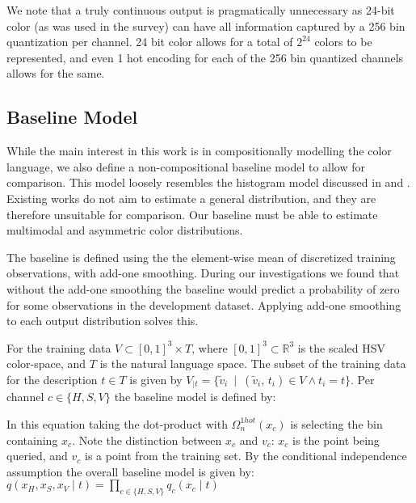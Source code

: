\documentclass[11pt,a4paper]{article}
\newcommand{\compactmath}[1]{\noindent\resizebox{\columnwidth}{!}{$#1$}}
\newcommand{\textcite}{\citet}
\begin{document}
We note that a truly continuous output is pragmatically unnecessary as 24-bit color (as was used in the survey) can have all information captured by a 256 bin quantization per channel.
24 bit color allows for a total of $2^{24}$ colors to be represented, and even 1 hot encoding for each of the 256 bin quantized channels allows for the same.


\subsection{Baseline Model}\label{sec:baseline-model}
While the main interest in this work is in compositionally modelling the color language,
we also define a non-compositional baseline model to allow for comparison.
This model loosely resembles the histogram model discussed in \textcite{meomcmahanstone:color} and \textcite{mcmahan2015bayesian}.
Existing works do not aim to estimate a general distribution, and they are therefore unsuitable for comparison.
Our baseline must be able to estimate multimodal and asymmetric color distributions.

The baseline is defined using the the element-wise mean of discretized  training observations, with add-one smoothing.
During our investigations we found that without the add-one smoothing the baseline would predict a probability of zero for some observations in the development dataset.
Applying add-one smoothing to each output distribution solves this.

For the training data $V \subset \left[ 0,1 \right] ^{3}\times T$, where $\left[ 0,1 \right] ^{3} \subset \mathbb{R}^{3}$ is the scaled HSV color-space, and $T$ is the natural language space.
The subset of the training data for the description $t \in T$ is given by
$V_{|t}=\{\tilde{v}_i \: \mid \: (\tilde{v}_i,\,t_i) \in V \wedge t_{i}=t\}$.
Per channel $c\in \lbrace H,S,V\rbrace$ the baseline model is defined by: 

\compactmath{
	q_{c}(x_{c}\mid t)=\frac{\displaystyle
		\sum_{\mathrlap{\!\!\!\!\!\!
				\forall(v_{H},v_{S},v_{V})\in V_{|t}}}
			\Omega_n^{blur}(v_{c},\mathcal{D}_c,\sigma)
			\cdot
			\Omega_n^{1hot}(x_{c})		
			+1}
		{\displaystyle \left|V_{|t}\right|+n}
}
%
In this equation taking the dot-product with $\Omega_n^{1hot}(x_{c})$ is selecting the bin containing $x_c$.
Note the distinction between $x_c$ and $v_c$: $x_c$ is the point being queried, and $v_c$ is a point from the training set.
By the conditional independence assumption the overall baseline model is given by: $q(x_H,x_S,x_V\mid t) = \prod_{c\in {\{H,S,V\}}} q_c(x_c\mid t)$
\end{document}
